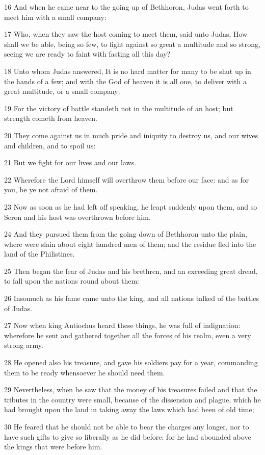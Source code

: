 \par 16 And when he came near to the going up of Bethhoron, Judas went forth to meet him with a small company:
\par 17 Who, when they saw the host coming to meet them, said unto Judas, How shall we be able, being so few, to fight against so great a multitude and so strong, seeing we are ready to faint with fasting all this day?
\par 18 Unto whom Judas answered, It is no hard matter for many to be shut up in the hands of a few; and with the God of heaven it is all one, to deliver with a great multitude, or a small company:
\par 19 For the victory of battle standeth not in the multitude of an host; but strength cometh from heaven.
\par 20 They come against us in much pride and iniquity to destroy us, and our wives and children, and to spoil us:
\par 21 But we fight for our lives and our laws.
\par 22 Wherefore the Lord himself will overthrow them before our face: and as for you, be ye not afraid of them.
\par 23 Now as soon as he had left off speaking, he leapt suddenly upon them, and so Seron and his host was overthrown before him.
\par 24 And they pursued them from the going down of Bethhoron unto the plain, where were slain about eight hundred men of them; and the residue fled into the land of the Philistines.
\par 25 Then began the fear of Judas and his brethren, and an exceeding great dread, to fall upon the nations round about them:
\par 26 Insomuch as his fame came unto the king, and all nations talked of the battles of Judas.
\par 27 Now when king Antiochus heard these things, he was full of indignation: wherefore he sent and gathered together all the forces of his realm, even a very strong army.
\par 28 He opened also his treasure, and gave his soldiers pay for a year, commanding them to be ready whensoever he should need them.
\par 29 Nevertheless, when he saw that the money of his treasures failed and that the tributes in the country were small, because of the dissension and plague, which he had brought upon the land in taking away the laws which had been of old time;
\par 30 He feared that he should not be able to bear the charges any longer, nor to have such gifts to give so liberally as he did before: for he had abounded above the kings that were before him.
